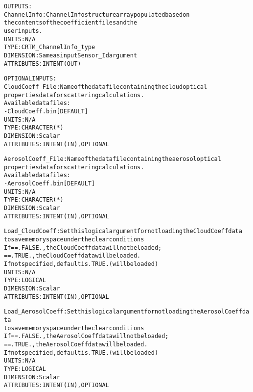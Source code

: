 \begin{alltt}
  OUTPUTS:
        ChannelInfo:        ChannelInfo structure array populated based on
                            the contents of the coefficient files and the
                            user inputs.
                            UNITS:      N/A
                            TYPE:       CRTM_ChannelInfo_type
                            DIMENSION:  Same as input Sensor_Id argument
                            ATTRIBUTES: INTENT(OUT)
 
  OPTIONAL INPUTS:
        CloudCoeff_File:    Name of the data file containing the cloud optical
                            properties data for scattering calculations.
                            Available datafiles:
                            - CloudCoeff.bin  [DEFAULT]
                            UNITS:      N/A
                            TYPE:       CHARACTER(*)
                            DIMENSION:  Scalar
                            ATTRIBUTES: INTENT(IN), OPTIONAL
 
        AerosolCoeff_File:  Name of the data file containing the aerosol optical
                            properties data for scattering calculations.
                            Available datafiles:
                            - AerosolCoeff.bin  [DEFAULT]
                            UNITS:      N/A
                            TYPE:       CHARACTER(*)
                            DIMENSION:  Scalar
                            ATTRIBUTES: INTENT(IN), OPTIONAL
 
        Load_CloudCoeff:    Set this logical argument for not loading the CloudCoeff data
                            to save memory space under the clear conditions
                            If == .FALSE., the CloudCoeff data will not be loaded;
                               == .TRUE.,  the CloudCoeff data will be loaded.
                            If not specified, default is .TRUE. (will be loaded)
                            UNITS:      N/A
                            TYPE:       LOGICAL
                            DIMENSION:  Scalar
                            ATTRIBUTES: INTENT(IN), OPTIONAL
 
        Load_AerosolCoeff:  Set this logical argument for not loading the AerosolCoeff data
                            to save memory space under the clear conditions
                            If == .FALSE., the AerosolCoeff data will not be loaded;
                               == .TRUE.,  the AerosolCoeff data will be loaded.
                            If not specified, default is .TRUE. (will be loaded)
                            UNITS:      N/A
                            TYPE:       LOGICAL
                            DIMENSION:  Scalar
                            ATTRIBUTES: INTENT(IN), OPTIONAL
 

\end{alltt}
